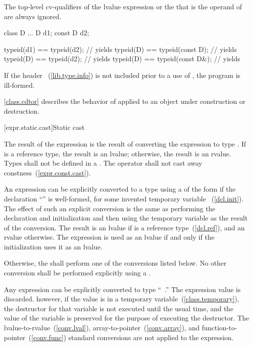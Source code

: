 \pnum
The top-level cv-qualifiers of the lvalue expression or the
 that is the operand of  are always
ignored.
\enterexample 

\begin{codeblock}
class D { ... }
D d1;
const D d2;

typeid(d1) == typeid(d2);		// yields 
typeid(D)  == typeid(const D);		// yields 
typeid(D)  == typeid(d2);		// yields 
typeid(D)  == typeid(const D&);		// yields 
\end{codeblock}
\exitexampleb

\pnum
If the header ~(\ref{lib.type.info}) is not included prior
to a use of , the program is ill-formed.

\pnum
\enternote
\ref{class.cdtor} describes the behavior of  applied to an
object under construction or destruction.
\exitnote 

[expr.static.cast]{Static cast}

\pnum
{}%
%
The result of the expression  is the result of
converting the expression  to type .
%
%
If  is a reference type, the result is an lvalue; otherwise,
the result is an rvalue. Types shall not be defined in a
. The  operator shall not cast
away constness~(\ref{expr.const.cast}).

\pnum
An expression  can be explicitly converted to a type 
using a  of the form  if
the declaration ``'' is well-formed, for some invented
temporary variable ~(\ref{dcl.init}). The effect of such an
explicit conversion is the same as performing the declaration and
initialization and then using the temporary variable as the result of
the conversion. The result is an lvalue if  is a reference
type~(\ref{dcl.ref}), and an rvalue otherwise. The expression 
is used as an lvalue if and only if the initialization uses it as an
lvalue.

\pnum
Otherwise, the  shall perform one of the conversions
listed below. No other conversion shall be performed explicitly using
a .

\pnum
Any expression can be explicitly converted to type ``\cv~.''
The expression value is discarded. \enternote however, if the value is
in a temporary variable~(\ref{class.temporary}), the destructor for that
variable is not executed until the usual time, and the value of the
variable is preserved for the purpose of executing the destructor.
\exitnote The lvalue-to-rvalue~(\ref{conv.lval}),
array-to-pointer~(\ref{conv.array}), and function-to-pointer~(\ref{conv.func})
standard conversions are not applied to the expression.

